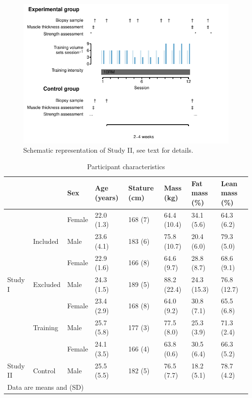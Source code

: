 \documentclass[twoside,10pt]{gihclass} %
\begin{document}
\begin{figure}

{\centering \includegraphics{thesis_files/figure-latex/study2-overview-1} 

}

\caption[Study II, schematic overview]{Schematic representation of Study II, see text for details.  }\label{fig:study2-overview}
\end{figure}
\begin{table}

\caption{\label{tab:characteristics-table}Participant characteristics}
\centering
\fontsize{7}{9}\selectfont
\begin{tabular}[t]{llllllll}
\toprule
  &   & Sex & Age (years) & Stature
(cm) & Mass (kg) & Fat mass (\%) & Lean mass (\%)\\
\midrule
 &  & Female & 22.0 (1.3) & 168 (7) & 64.4 (10.4) & 34.1 (5.6) & 64.3 (6.2)\\
\cmidrule{3-8}
 & \multirow{-2}{*}{\raggedright\arraybackslash Included} & Male & 23.6 (4.1) & 183 (6) & 75.8 (10.7) & 20.4 (6.0) & 79.3 (5.0)\\
\cmidrule{2-8}
 &  & Female & 22.9 (1.6) & 166 (8) & 64.6 (9.7) & 28.8 (8.7) & 68.6 (9.1)\\
\cmidrule{3-8}
\multirow{-4}{*}{\raggedright\arraybackslash Study I} & \multirow{-2}{*}{\raggedright\arraybackslash Excluded} & Male & 24.3 (1.5) & 189 (5) & 88.2 (22.4) & 24.3 (15.3) & 76.8 (12.7)\\
\cmidrule{1-8}
 &  & Female & 23.4 (2.9) & 168 (8) & 64.0 (9.2) & 30.8 (7.1) & 65.5 (6.8)\\
\cmidrule{3-8}
 & \multirow{-2}{*}{\raggedright\arraybackslash Training} & Male & 25.7 (5.8) & 177 (3) & 77.5 (8.0) & 25.3 (3.9) & 71.3 (2.4)\\
\cmidrule{2-8}
 &  & Female & 24.1 (3.5) & 166 (4) & 63.8 (0.6) & 30.5 (6.4) & 66.3 (5.2)\\
\cmidrule{3-8}
\multirow{-4}{*}{\raggedright\arraybackslash Study II} & \multirow{-2}{*}{\raggedright\arraybackslash Control} & Male & 25.5 (5.5) & 182 (5) & 76.5 (7.7) & 18.2 (5.1) & 78.7 (4.2)\\
\bottomrule
\multicolumn{8}{l}{\rule{0pt}{1em}Data are means and (SD)}\\
\end{tabular}
\end{table}
\end{document}
